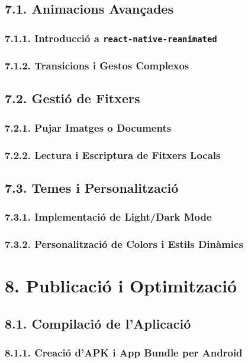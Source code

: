 \documentclass[12pt]{beamer}
\begin{document}
	\subsection{7.1. Animacions Avançades}
	\subsubsection{7.1.1. Introducció a \texttt{react-native-reanimated}}
	\subsubsection{7.1.2. Transicions i Gestos Complexos}
	
	\subsection{7.2. Gestió de Fitxers}
	\subsubsection{7.2.1. Pujar Imatges o Documents}
	\subsubsection{7.2.2. Lectura i Escriptura de Fitxers Locals}
	
	\subsection{7.3. Temes i Personalització}
	\subsubsection{7.3.1. Implementació de Light/Dark Mode}
	\subsubsection{7.3.2. Personalització de Colors i Estils Dinàmics}
	
	\section{8. Publicació i Optimització}
	
	\subsection{8.1. Compilació de l’Aplicació}
	\subsubsection{8.1.1. Creació d’APK i App Bundle per Android}
\end{document}
